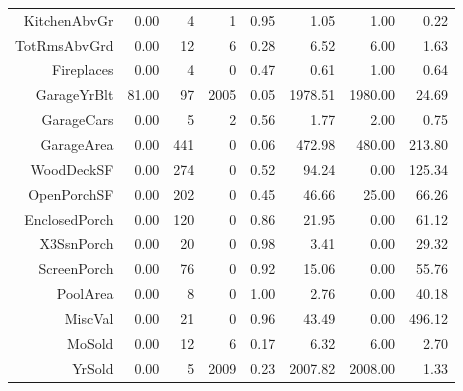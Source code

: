 \begin{table}[ht]
\begin{tabular}{rrrrrrrr}
  KitchenAbvGr & 0.00 &   4 &   1 & 0.95 & 1.05 & 1.00 & 0.22 \\ 
  TotRmsAbvGrd & 0.00 &  12 &   6 & 0.28 & 6.52 & 6.00 & 1.63 \\ 
  Fireplaces & 0.00 &   4 &   0 & 0.47 & 0.61 & 1.00 & 0.64 \\ 
  GarageYrBlt & 81.00 &  97 & 2005 & 0.05 & 1978.51 & 1980.00 & 24.69 \\ 
  GarageCars & 0.00 &   5 &   2 & 0.56 & 1.77 & 2.00 & 0.75 \\ 
  GarageArea & 0.00 & 441 &   0 & 0.06 & 472.98 & 480.00 & 213.80 \\ 
  WoodDeckSF & 0.00 & 274 &   0 & 0.52 & 94.24 & 0.00 & 125.34 \\ 
  OpenPorchSF & 0.00 & 202 &   0 & 0.45 & 46.66 & 25.00 & 66.26 \\ 
  EnclosedPorch & 0.00 & 120 &   0 & 0.86 & 21.95 & 0.00 & 61.12 \\ 
  X3SsnPorch & 0.00 &  20 &   0 & 0.98 & 3.41 & 0.00 & 29.32 \\ 
  ScreenPorch & 0.00 &  76 &   0 & 0.92 & 15.06 & 0.00 & 55.76 \\ 
  PoolArea & 0.00 &   8 &   0 & 1.00 & 2.76 & 0.00 & 40.18 \\ 
  MiscVal & 0.00 &  21 &   0 & 0.96 & 43.49 & 0.00 & 496.12 \\ 
  MoSold & 0.00 &  12 &   6 & 0.17 & 6.32 & 6.00 & 2.70 \\ 
  YrSold & 0.00 &   5 & 2009 & 0.23 & 2007.82 & 2008.00 & 1.33 \\ 
   \hline
\end{tabular}
\end{table}
